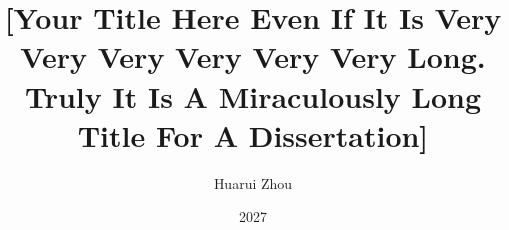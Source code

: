 \documentclass[oneside,openany]{dukedissertation2026}
\author{Huarui Zhou}
\title{[Your Title Here Even If It Is Very Very Very Very Very Very Long. Truly It Is A Miraculously Long Title For A Dissertation]}
\date{2027} %
\begin{document}
\maketitle


\dedication{If you want to dedicate your thesis to anyone do so here.}

\tableofcontents %

\listoftables	%

\listoffigures	%




%
%
%


\end{document}
